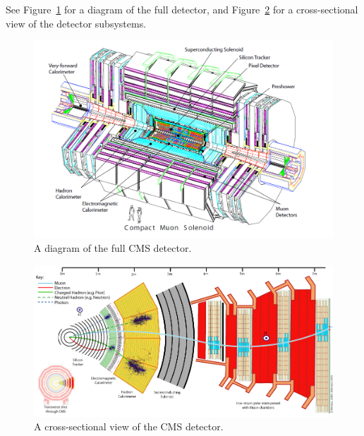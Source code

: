 See Figure~\ref{figs:CMSdiagram1} for a diagram of the full detector, and Figure~\ref{figs:CMSdiagram} for a cross-sectional view of the detector subsystems.

\begin{figure}
\begin{center}
\includegraphics[width=1.0\linewidth]{figs/CMSdiagram1.png}
\caption{A diagram of the full CMS detector.}
\label{figs:CMSdiagram1}
\end{center}
\end{figure}

\begin{figure}
\begin{center}
\includegraphics[width=1.0\linewidth]{figs/CMSdiagram.png}
\caption{A cross-sectional view of the CMS detector.}
\label{figs:CMSdiagram}
\end{center}
\end{figure}



